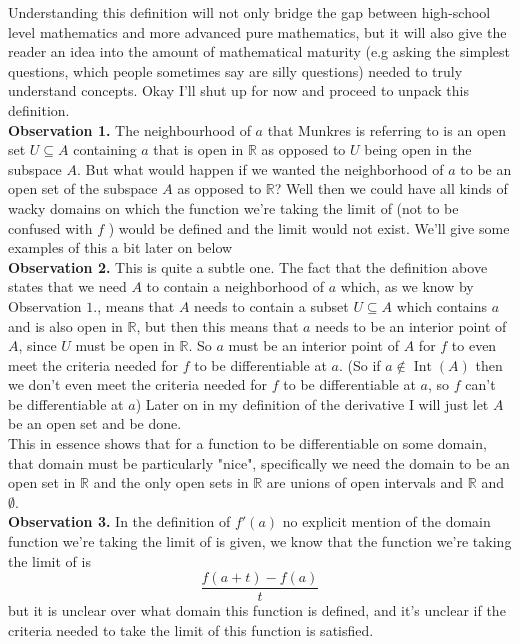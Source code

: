 	Understanding this definition will not only bridge the gap between high-school level mathematics and more advanced pure mathematics, but it will also give the reader an idea into the amount of mathematical maturity (e.g asking the simplest questions, which people sometimes say are silly questions) needed to truly understand concepts. Okay I'll shut up for now and proceed to unpack this definition. \\
	
	\textbf{Observation 1.}  The neighbourhood of $a$ that Munkres is referring to is an open set $U \subseteq A$  containing $a$ that is open in $\mathbb{R}$ as opposed to $U$ being open in the subspace $A$. But what would happen if we wanted the neighborhood of $a$ to be an open set of the subspace $A$ as opposed to $\mathbb{R}$? Well then we could have all kinds of wacky domains on which the function  we're taking the limit of (not to be confused with $f$ ) would be defined and the limit would not exist. We'll give some examples of this a bit later on below \\
	
	\textbf{Observation 2.} This is quite a subtle one. The fact that the definition above states that we need $A$ to contain a neighborhood of $a$ which, as we know by Observation $1.$, means that $A$ needs to contain a subset $U \subseteq A$ which contains $a$ and is also open in $\mathbb{R}$, but then this means that $a$ needs to be an interior point of $A$, since $U$ must be open in $\mathbb{R}$. So $a$ must be an interior point of $A$ for $f$ to even meet the criteria needed for $f$ to be differentiable at $a$. (So if $a\not\in \operatorname{Int}(A)$ then we don't even meet the criteria needed for $f$ to be differentiable at $a$, so $f$ can't be differentiable at $a$) Later on in my definition of the derivative I will just let $A$ be an open set and be done. \\
	
	This in essence shows that for a function to be differentiable on some domain, that domain must be particularly "nice", specifically we need the domain to be an open set in $\mathbb{R}$ and the only open sets in $\mathbb{R}$ are unions of open intervals and $\mathbb{R}$ and $\emptyset$. \\ 
		
	\textbf{Observation 3.} In the definition of $f'(a)$ no explicit mention of the domain function we're taking the limit of is given, we know that the function we're taking the limit of is $$\frac{f(a+t) - f(a)}{t}$$ but it is unclear over what domain this function is defined, and it's unclear if the criteria needed to take the limit of this function is satisfied. \\
	
